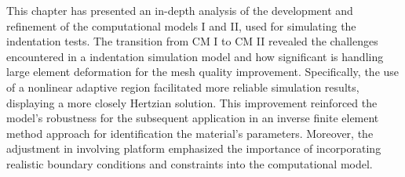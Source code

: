 This chapter has presented an in-depth analysis of the development and refinement of the computational models I and II, used
for simulating the indentation tests. The transition from CM I to CM II revealed the challenges encountered in a indentation 
simulation model and how significant is handling large element deformation for the mesh quality improvement. 
Specifically, the use of a nonlinear adaptive region facilitated more reliable simulation results, displaying a more 
closely Hertzian solution. This improvement reinforced the model's robustness for the subsequent application in an inverse
finite element method approach for identification the material's parameters. Moreover, the adjustment in involving platform
emphasized the importance of incorporating realistic boundary conditions and constraints into the computational model.






